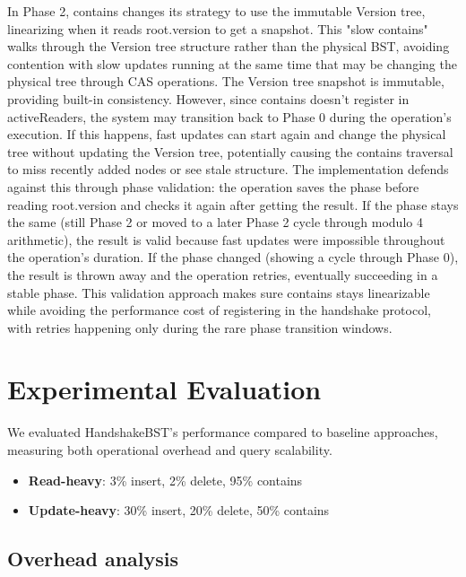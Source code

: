 \documentclass[acmsmall,screen,nonacm]{acmart}
\newcommand{\codestyle}[1]{{{\fontsize{9}{10}\ttfamily #1}}}
\newcommand{\ins}{\codestyle{in\-sert}}
\newcommand{\del}{\codestyle{de\-lete}}
\newcommand{\contains}{\codestyle{con\-tains}}
\begin{document}
In Phase 2, \codestyle{contains} changes its strategy to use the immutable Version tree, linearizing when it reads \codestyle{root.version} to get a snapshot. This "slow contains" walks through the Version tree structure rather than the physical BST, avoiding contention with slow updates running at the same time that may be changing the physical tree through CAS operations. The Version tree snapshot is immutable, providing built-in consistency. However, since \codestyle{contains} doesn't register in \codestyle{activeReaders}, the system may transition back to Phase 0 during the operation's execution. If this happens, fast updates can start again and change the physical tree without updating the Version tree, potentially causing the \codestyle{contains} traversal to miss recently added nodes or see stale structure. The implementation defends against this through phase validation: the operation saves the phase before reading \codestyle{root.version} and checks it again after getting the result. If the phase stays the same (still Phase 2 or moved to a later Phase 2 cycle through modulo 4 arithmetic), the result is valid because fast updates were impossible throughout the operation's duration. If the phase changed (showing a cycle through Phase 0), the result is thrown away and the operation retries, eventually succeeding in a stable phase. This validation approach makes sure \codestyle{contains} stays linearizable while avoiding the performance cost of registering in the handshake protocol, with retries happening only during the rare phase transition windows.


\section{Experimental Evaluation}

We evaluated HandshakeBST's performance compared to baseline approaches, measuring both operational overhead and query scalability. 


\begin{itemize}
\item \textbf{Read-heavy}: 3\% \ins{}, 2\% \del{}, 95\% \contains{}
\item \textbf{Update-heavy}: 30\% \ins{}, 20\% \del{}, 50\% \contains{}
\end{itemize}

\subsection{Overhead analysis}
\end{document}
